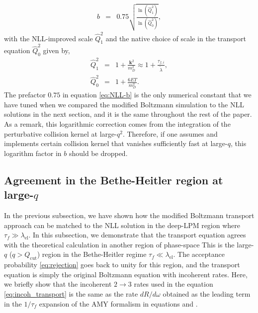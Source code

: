 \documentclass[aps, prc, reprint, amsmath, groupedaddress, nofootinbib]{revtex4-1}
\begin{document}
\begin{eqnarray}
b &=& 0.75\sqrt{\frac{\ln(\hat{Q}_1^2 )}{\ln(\hat{Q}_0^2 )}},
\label{eq:NLL-b}
\end{eqnarray}
with the NLL-improved scale $\hat{Q}_1^2$ and the native choice of scale in the transport equation $\hat{Q}_0^2$ given by,
\begin{eqnarray}
\hat{Q}_1^2 &=& 1 + \frac{\mathbf{k}^2}{m_D^2} \approx 1 + \frac{\tau_{f,i}}{\tilde{\lambda}}, \\ 
\hat{Q}_0^2 &=& 1 + \frac{6ET}{m_D^2}.
\end{eqnarray}
The prefactor $0.75$ in equation \ref{eq:NLL-b} is the only numerical constant that we have tuned when we compared the modified Boltzmann simulation to the NLL solutions in the next section, and it is the same throughout the rest of the paper.
As a remark, this logarithmic correction comes from the integration of the perturbative collision kernel at large-$q^2$.
Therefore, if one assumes and implements certain collision kernel that vanishes sufficiently fast at large-$q$, this logarithm factor in $b$ should be dropped. 

\subsection{Agreement in the Bethe-Heitler region at large-$q$}
In the previous subsection, we have shown how the modified Boltzmann transport approach can be matched to the NLL solution in the deep-LPM region where $\tau_f \gg \lambda_{\textrm{el}}$.
In this subsection, we demonstrate that the transport equation agrees  with the theoretical calculation in another region of phase-space
This is the large-$q$ ($q>Q_{\textrm{cut}}$) region in the Bethe-Heitler regime $\tau_f \ll \lambda_{\textrm{el}}$.
The acceptance probability \ref{eq:rejection} goes back to unity for this region, and the transport equation is simply the original Boltzmann equation with incoherent rates.
Here, we briefly show that the incoherent $2\rightarrow 3$ rates used in the equation \ref{eq:incoh_transport} is the same as the rate $dR/d\omega$ obtained as the leading term in the $1/\tau_f$ expansion of the AMY formalism in equations \label{eq:AMY-1} and \label{eq:AMY-2}.
\end{document}
